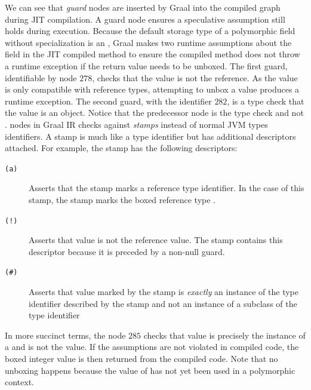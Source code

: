 We can see that \textit{guard} nodes are inserted by Graal into the compiled graph during JIT compilation.
A guard node ensures a speculative assumption still holds during execution.
Because the default storage type of a polymorphic field without specialization is an , Graal makes two runtime assumptions about the field in the JIT compiled  method to ensure the compiled method does not throw a runtime exception if the return value needs to be unboxed.
The first guard, identifiable by node $278$, checks that the value is not the  reference.
As the  value is only compatible with reference types, attempting to unbox a  value produces a runtime exception.
The second guard, with the identifier $282$, is a type check that the value is an  object.
Notice that the predecessor node is the type check  and not .
 nodes in Graal IR checks against \textit{stamps} instead of normal JVM types identifiers.
A stamp is much like a type identifier but has additional descriptors attached.
For example, the stamp  has the following descriptors:

\begin{description}
	\item[\texttt{(a)}] Asserts that the stamp marks a reference type identifier. In the case of this stamp, the stamp marks the boxed reference type .
	\item[\texttt{(!)}] Asserts that value is not the  reference value. The stamp contains this descriptor because it is preceded by a non-null guard.
	\item[\texttt{(\#)}] Asserts that value marked by the stamp is \textit{exactly} an instance of the type identifier described by the stamp and not an instance of a subclass of the type identifier
\end{description}

In more succinct terms, the  node $285$ checks that value is precisely the instance of a  and is not the  value. 
If the assumptions are not violated in compiled code, the boxed integer value is then returned from the compiled code.
Note that no unboxing happens because the value of  has not yet been used in a polymorphic context.

